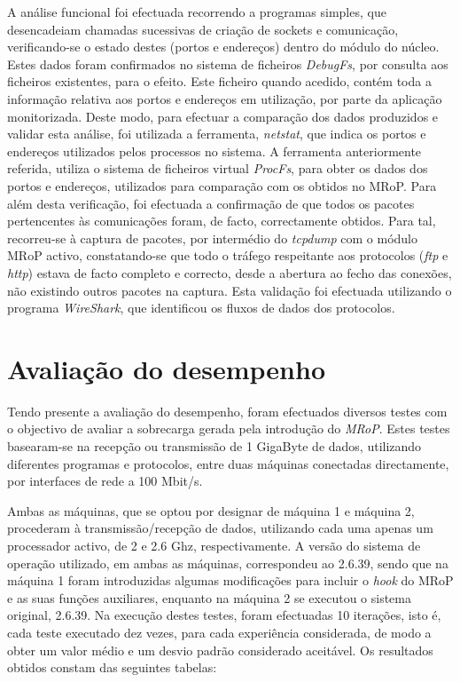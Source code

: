 A análise funcional foi efectuada recorrendo a programas simples, que desencadeiam chamadas sucessivas de criação de sockets e comunicação, verificando-se o estado destes (portos e endereços) dentro do módulo do núcleo.
Estes dados foram confirmados no sistema de ficheiros \textit{DebugFs}, por consulta aos ficheiros existentes, para o efeito.
Este ficheiro quando acedido, contém toda a informação relativa aos portos e endereços em utilização, por parte da aplicação monitorizada.
Deste modo, para efectuar a comparação dos dados produzidos e validar esta análise, foi utilizada a ferramenta, \textit{netstat}, que indica os portos e endereços utilizados pelos processos no sistema.
A ferramenta anteriormente referida, utiliza o sistema de ficheiros virtual \textit{ProcFs}, para obter os dados dos portos e endereços, utilizados para comparação com os obtidos no MRoP.
Para além desta verificação, foi efectuada a confirmação de que todos os pacotes pertencentes às comunicações foram, de facto, correctamente obtidos.
Para tal, recorreu-se à captura de pacotes, por intermédio do \textit{tcpdump} com o módulo MRoP activo, constatando-se que todo o tráfego respeitante aos protocolos (\textit{ftp} e \textit{http}) estava de facto completo e correcto, desde a abertura ao fecho das conexões, não existindo outros pacotes na captura.
Esta validação foi efectuada utilizando o programa \textit{WireShark}, que identificou os fluxos de dados dos protocolos.


\section{Avaliação do desempenho}
\label{sec:eval_performance}

Tendo presente a avaliação do desempenho, foram efectuados diversos testes com o objectivo de avaliar a sobrecarga gerada pela introdução do \textit{MRoP}.
Estes testes basearam-se na recepção ou transmissão de 1 GigaByte de dados, utilizando diferentes programas e protocolos, entre duas máquinas conectadas directamente, por interfaces de rede a 100 Mbit/s.

Ambas as máquinas, que se optou por designar de máquina 1 e máquina 2, procederam à transmissão/recepção de dados, utilizando cada uma apenas um processador activo, de 2 e 2.6 Ghz, respectivamente.
A versão do sistema de operação utilizado, em ambas as máquinas, correspondeu ao 2.6.39, sendo que na máquina 1 foram introduzidas algumas modificações para incluir o \textit{hook} do MRoP e as suas funções auxiliares, enquanto na máquina 2 se executou o sistema original, 2.6.39.
Na execução destes testes, foram efectuadas 10 iterações, isto é, cada teste executado dez vezes, para cada experiência considerada, de modo a obter um valor médio e um desvio padrão considerado aceitável.
Os resultados obtidos constam das seguintes tabelas:

